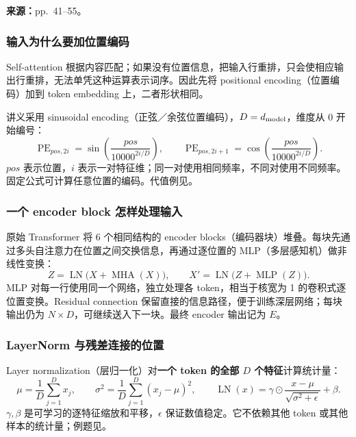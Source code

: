 
\textbf{来源：}pp.~41--55。

\subsubsection{输入为什么要加位置编码}

Self-attention 根据内容匹配；如果没有位置信息，把输入行重排，只会使相应输出行重排，无法单凭这种运算表示词序。因此先将 positional encoding（位置编码）加到 token embedding 上，二者形状相同。

讲义采用 sinusoidal encoding（正弦／余弦位置编码），$D=d_{\rm model}$，维度从 $0$ 开始编号：
\[
 \operatorname{PE}_{pos,2i}=\sin\!\left(\frac{pos}{10000^{2i/D}}\right),\qquad
 \operatorname{PE}_{pos,2i+1}=\cos\!\left(\frac{pos}{10000^{2i/D}}\right).
\]
$pos$ 表示位置，$i$ 表示一对特征维；同一对使用相同频率，不同对使用不同频率。固定公式可计算任意位置的编码。代值例见。

\subsubsection{一个 encoder block 怎样处理输入}

原始 Transformer 将 6 个相同结构的 encoder blocks（编码器块）堆叠。每块先通过多头自注意力在位置之间交换信息，再通过逐位置的 MLP（多层感知机）做非线性变换：
\[
 \boxed{Z=\operatorname{LN}\bigl(X+\operatorname{MHA}(X)\bigr),\qquad
 X'=\operatorname{LN}\bigl(Z+\operatorname{MLP}(Z)\bigr)}.
\]
MLP 对每一行使用同一个网络，独立处理各 token，相当于核宽为 1 的卷积式逐位置变换。Residual connection 保留直接的信息路径，便于训练深层网络；每块输出仍为 $N\times D$，可继续送入下一块。最终 encoder 输出记为 $E$。

\subsubsection{LayerNorm 与残差连接的位置}

Layer normalization（层归一化）对\textbf{一个 token 的全部 $D$ 个特征}计算统计量：
\[
 \mu=\frac1D\sum_{j=1}^{D}x_j,\qquad
 \sigma^2=\frac1D\sum_{j=1}^{D}(x_j-\mu)^2,\qquad
 \operatorname{LN}(x)=\gamma\odot\frac{x-\mu}{\sqrt{\sigma^2+\epsilon}}+\beta.
\]
$\gamma,\beta$ 是可学习的逐特征缩放和平移，$\epsilon$ 保证数值稳定。它不依赖其他 token 或其他样本的统计量；例题见。

